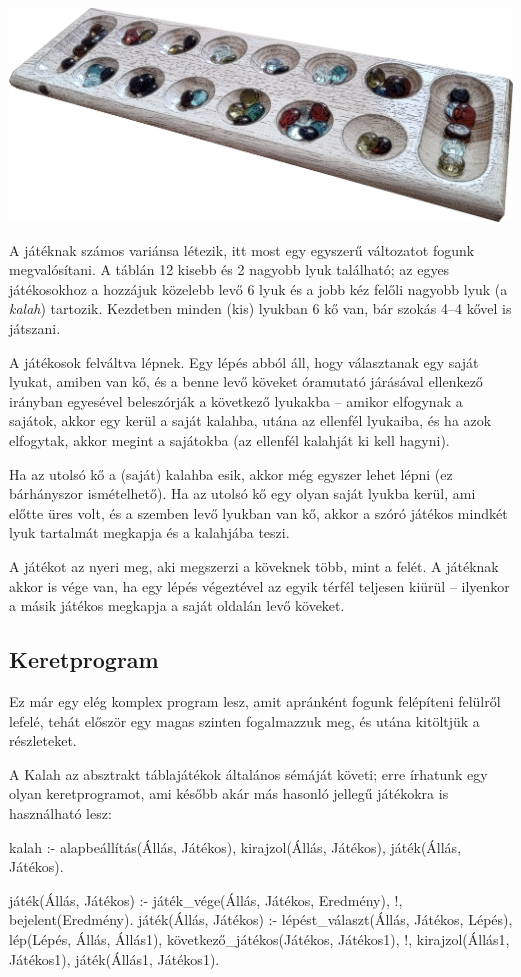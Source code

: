 \begin{center}
\includegraphics[width=\textwidth]{images/kalah.jpg}
\end{center}

A játéknak számos variánsa létezik, itt most egy
egyszerű változatot fogunk megvalósítani. A táblán
12 kisebb és 2 nagyobb lyuk található; az egyes
játékosokhoz a hozzájuk közelebb levő 6 lyuk és a
jobb kéz felőli nagyobb lyuk (a \emph{kalah})
tartozik. Kezdetben minden (kis) lyukban 6 kő van,
bár szokás 4--4 kővel is játszani.

A játékosok felváltva lépnek. Egy lépés abból áll,
hogy választanak egy saját lyukat, amiben van kő, és
a benne levő köveket óramutató járásával ellenkező
irányban egyesével beleszórják a következő lyukakba
-- amikor elfogynak a sajátok, akkor egy kerül a
saját kalahba, utána az ellenfél lyukaiba, és ha
azok elfogytak, akkor megint a sajátokba (az
ellenfél kalahját ki kell hagyni).

Ha az utolsó kő a (saját) kalahba esik, akkor még
egyszer lehet lépni (ez bárhányszor ismételhető). Ha
az utolsó kő egy olyan saját lyukba kerül, ami
előtte üres volt, és a szemben levő lyukban van kő,
akkor a szóró játékos mindkét lyuk tartalmát
megkapja és a kalahjába teszi.

A játékot az nyeri meg, aki megszerzi a köveknek
több, mint a felét. A játéknak akkor is vége van, ha
egy lépés végeztével az egyik térfél teljesen kiürül
-- ilyenkor a másik játékos megkapja a saját oldalán
levő köveket.

\subsection*{Keretprogram}

Ez már egy elég komplex program lesz, amit apránként
fogunk felépíteni felülről lefelé, tehát először
egy magas szinten fogalmazzuk meg, és utána
kitöltjük a részleteket.

A Kalah az absztrakt táblajátékok általános sémáját
követi; erre írhatunk egy olyan keretprogramot, ami
később akár más hasonló jellegű játékokra is
használható lesz:
\begin{program}
kalah :-
    alapbeállítás(Állás, Játékos),
    kirajzol(Állás, Játékos),
    játék(Állás, Játékos).

játék(Állás, Játékos) :-
    játék_vége(Állás, Játékos, Eredmény), !,
    bejelent(Eredmény).
játék(Állás, Játékos) :-
    lépést_választ(Állás, Játékos, Lépés),
    lép(Lépés, Állás, Állás1),
    következő_játékos(Játékos, Játékos1), !,
    kirajzol(Állás1, Játékos1),
    játék(Állás1, Játékos1).
\end{program}

